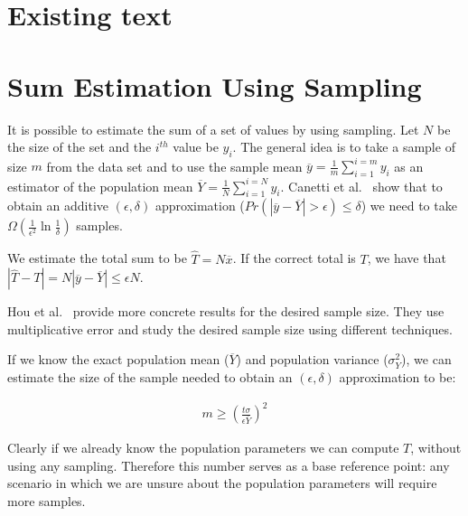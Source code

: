 \documentclass[11pt,twocolumn]{MyTightStyle}
\theoremstyle{plain}
\theoremstyle{definition}
\theoremstyle{remark}
\numberwithin{equation}{section}
\begin{document}
%

\section{Existing text}


\section{Sum Estimation Using Sampling}

  It is possible to estimate the sum of a set of values by using
  sampling. Let $N$ be the size of the set and the $i^{th}$ value be
  $y_i$. The general idea is to take a sample of size $m$ from the
  data set and to use the sample mean $\overline{y} =
  \frac{1}{m}\sum_{i=1}^{i=m}y_i$ as an estimator of the population
  mean $\overline{Y} = \frac{1}{N}\sum_{i=1}^{i=N}y_i$. Canetti et
  al.~\cite{canetti94lower} show that to obtain an additive
  $(\epsilon, \delta)$ approximation ($Pr(|\overline{y}-\overline{Y}|
  > \epsilon) \leq \delta$) we need to take
  $\Omega(\frac{1}{\epsilon^2}\ln\frac{1}{\delta})$ samples. 

  We estimate the total sum to be $\widehat{T} = N\overline{x}$. If
  the correct total is $T$, we have that $|\widehat{T}-T| =
  N|\overline{y}-\overline{Y}| \leq \epsilon N$. 

  Hou et al.~\cite{hou91error} provide more concrete results for the
  desired sample size. They use multiplicative error and study the
  desired sample size using different techniques.

  If we know the exact population mean ($\overline{Y}$) and population
  variance ($\sigma_{Y}^2$), we can estimate the size of the sample
  needed to obtain an $(\epsilon, \delta)$ approximation to be:

  \begin{eqnarray*}
    m \geq (\frac{t\sigma}{\epsilon\overline{Y}})^2
  \end{eqnarray*}

  Clearly if we already know the population parameters we can compute
  $T$, without using any sampling. Therefore this number serves as a
  base reference point: any scenario in which we are unsure about the
  population parameters will require more samples.
\end{document}
